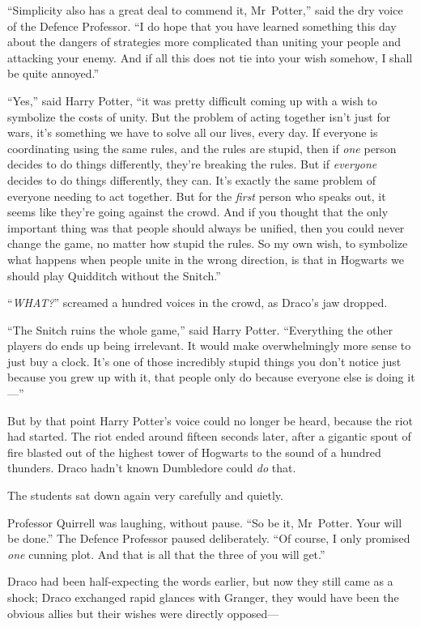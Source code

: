 “Simplicity also has a great deal to commend it, Mr~Potter,” said the dry
voice of the Defence Professor. “I do hope that you have learned something this
day about the dangers of strategies more complicated than uniting your people
and attacking your enemy. And if all this does not tie into your wish somehow,
I shall be quite annoyed.”

“Yes,” said Harry Potter, “it was pretty difficult coming up with a wish to
symbolize the costs of unity. But the problem of acting together isn’t just for
wars, it’s something we have to solve all our lives, every day. If everyone is
coordinating using the same rules, and the rules are stupid, then if \emph{one}
person decides to do things differently, they’re breaking the rules. But if
\emph{everyone} decides to do things differently, they can. It’s exactly the
same problem of everyone needing to act together. But for the \emph{first}
person who speaks out, it seems like they’re going against the crowd. And if
you thought that the only important thing was that people should always be
unified, then you could never change the game, no matter how stupid the rules.
So my own wish, to symbolize what happens when people unite in the wrong
direction, is that in Hogwarts we should play Quidditch without the Snitch.”

“\emph{WHAT?}” screamed a hundred voices in the crowd, as Draco’s jaw dropped.

“The Snitch ruins the whole game,” said Harry Potter. “Everything the other
players do ends up being irrelevant. It would make overwhelmingly more sense to
just buy a clock. It’s one of those incredibly stupid things you don’t notice
just because you grew up with it, that people only do because everyone else is
doing it—”

But by that point Harry Potter’s voice could no longer be heard, because the
riot had started.
\later
The riot ended around fifteen seconds later, after a gigantic spout of fire
blasted out of the highest tower of Hogwarts to the sound of a hundred
thunders. Draco hadn’t known Dumbledore could \emph{do} that.

The students sat down again very carefully and quietly.

Professor Quirrell was laughing, without pause. “So be it, Mr~Potter. Your
will be done.” The Defence Professor paused deliberately. “Of course, I only
promised \emph{one} cunning plot. And that is all that the three of you will
get.”

Draco had been half-expecting the words earlier, but now they still came as a
shock; Draco exchanged rapid glances with Granger, they would have been the
obvious allies but their wishes were directly opposed—

